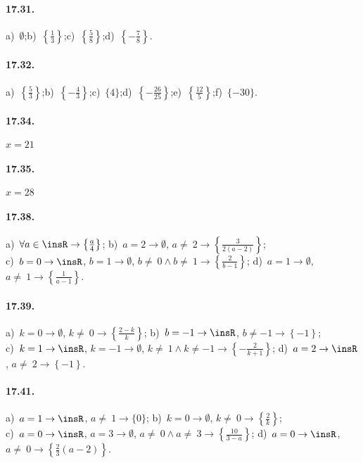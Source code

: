 \paragraph{17.31.}
a)~$\emptyset$;\quad b)~$\left\{\frac{1}{3}\right\}$;\quad c)~$\left\{\frac{5}{8}\right\}$;\quad d)~$\left\{-{\frac{7}{8}}\right\}$.

\paragraph{17.32.}
a)~$\left\{\frac{5}{3}\right\}$;\quad b)~$\left\{-\frac{4}{3}\right\}$;\quad c)~$\{4\}$;\quad d)~$\left\{-{\frac{26}{25}}\right\}$;\quad e)~$\left\{\frac{12}{5}\right\}$;\quad f)~$\{-30\}$.

\paragraph{17.34.} $x=21$

\paragraph{17.35.} $x=28$

\paragraph{17.38.}
a)~$\forall a\in \insR \rightarrow \left\{\frac{a}{4}\right\}$;
\quad b)~$a=2 \rightarrow \emptyset$, $a\neq~2 \rightarrow \left\{\frac{3}{2(a-2)}\right\}$;
\quad \protect\\
c)~$b=0 \rightarrow \insR$, $b=1\rightarrow\emptyset$, $b\neq~0\wedge b\neq~1\rightarrow \left\{\frac{2}{b-1}\right\}$;
\quad d)~$a=1\rightarrow \emptyset$, $a\neq~1\rightarrow \left\{\frac{1}{a-1}\right\}$.

\paragraph{17.39.}
a)~$k=0 \rightarrow \emptyset$, $k\neq~0 \rightarrow \left\{\frac{2-k}{k}\right\}$;
\quad b)~$b=-1 \rightarrow \insR$, $b\neq -1 \rightarrow \left\{-1\right\}$;
\quad \protect\\
c)~$k=1 \rightarrow \insR$, $k=-1 \rightarrow \emptyset$, $k\neq~1\wedge k\neq -1 \rightarrow \left\{-{\frac{2}{k+1}}\right\}$;
\quad d)~$a=2 \rightarrow \insR$, $a\neq~2 \rightarrow \left\{-1\right\}$.

\paragraph{17.41.}
a)~$a=1 \rightarrow \insR$, $a\neq~1 \rightarrow \{0\}$;
\quad b)~$k=0 \rightarrow \emptyset$, $k\neq~0 \rightarrow \left\{\frac{2}{k}\right\}$;
\quad \protect\\
c)~$a=0 \rightarrow \insR$, $a=3\rightarrow \emptyset$, $a\neq~0 \wedge a\neq~3 \rightarrow \left\{\frac{10}{3-a}\right\}$;
\quad d)~$a=0 \rightarrow \insR$, $a\neq~0 \rightarrow \left\{\frac{2}{3} (a-2)\right\}$.

